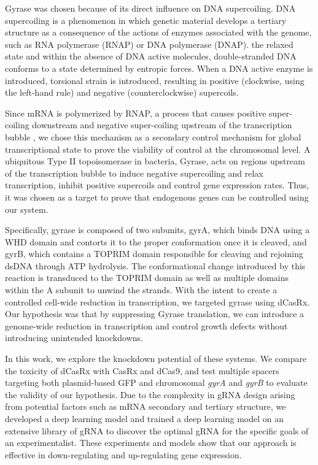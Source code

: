 \documentclass[times]{zHenriquesLab-StyleBioRxiv}
\begin{document}
Gyrase was chosen because of its direct influence on DNA supercoiling.
DNA supercoiling is a phenomenon in which genetic material develops a tertiary structure as a consequence of the actions of enzymes associated with the genome, such as RNA polymerase (RNAP) or DNA polymerase (DNAP)\textsuperscript{\cite{Cozzarelli1980}}.
the relaxed state and within the absence of DNA active molecules, double-stranded DNA conforms to a state determined by entropic forces. When a DNA active enzyme is introduced, torsional strain is introduced, resulting in positive (clockwise, using the left-hand rule) and negative (counterclockwise) supercoils. 

Since mRNA is polymerized by RNAP, a process that causes positive super-coiling downstream and negative super-coiling upstream of the transcription bubble \cite{RAHMOUNI1992131}, we chose this mechanism as a secondary control mechanism for global transcriptional state to prove the viability of control at the chromosomal level. A ubiquitous Type II topoisomerase in bacteria, Gyrase, acts on regions upstream of the transcription bubble to induce negative supercoiling and relax transcription, inhibit positive supercoils and control gene expression rates. Thus, it was chosen as a target to prove that endogenous genes can be controlled using our system. %
 
Specifically, gyrase is composed of two subunits, gyrA, which binds DNA using a WHD domain and contorts it to the proper conformation once it is cleaved, and gyrB, which contains a TOPRIM domain responsible for cleaving and rejoining dsDNA through ATP hydrolysis. The conformational change introduced by this reaction is transduced to the TOPRIM domain as well as multiple domains within the A subunit to unwind the strands. With the intent to create a controlled cell-wide reduction in transcription, we targeted gyrase using dCasRx. Our hypothesis was that by suppressing Gyrase translation, we can introduce a genome-wide reduction in transcription and control growth defects without introducing unintended knockdowns.

 In this work, we explore the knockdown potential of these systems.  We compare the toxicity of dCasRx with CasRx and dCas9, and test multiple spacers targeting both plasmid-based GFP and chromosomal {\it gyrA} and {\it gyrB} to evaluate the validity of our hypothesis. Due to the complexity in gRNA design arising from potential factors such as mRNA secondary and tertiary structure, we developed a deep learning model and trained a deep learning model on an extensive library of gRNA to discover the optimal gRNA for the specific goals of an experimentalist. These experiments and models show that our approach is effective in down-regulating and up-regulating gene expression.
 
\end{document}
